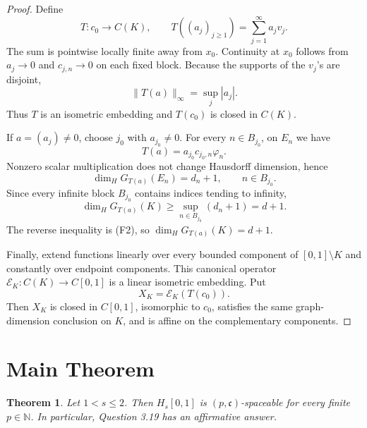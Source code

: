 \documentclass[11pt]{article}
\newtheorem*{theorem}{Theorem}
\newcommand{\cE}{\mathcal E}
\newcommand{\NN}{\mathbb N}
\newcommand{\cc}{\mathfrak c}
\newcommand{\dimH}{\dim_{\!H}}
\begin{document}
\begin{proof}
Define
\[
T:c_0\longrightarrow C(K),\qquad
T((a_j)_{j\geq1})=\sum_{j=1}^\infty a_jv_j.
\]
The sum is pointwise locally finite away from \(x_0\).  Continuity at \(x_0\)
follows from \(a_j\to0\) and \(c_{j,n}\to0\) on each fixed block.  Because the
supports of the \(v_j\)'s are disjoint,
\[
\|T(a)\|_\infty=\sup_j |a_j|.
\]
Thus \(T\) is an isometric embedding and \(T(c_0)\) is closed in \(C(K)\).

If \(a=(a_j)\neq0\), choose \(j_0\) with \(a_{j_0}\neq0\).  For every
\(n\in B_{j_0}\), on \(E_n\) we have
\[
T(a)=a_{j_0}c_{j_0,n}\varphi_n.
\]
Nonzero scalar multiplication does not change Hausdorff dimension, hence
\[
\dimH G_{T(a)}(E_n)=d_n+1,\qquad n\in B_{j_0}.
\]
Since every infinite block \(B_{j_0}\) contains indices tending to infinity,
\[
\dimH G_{T(a)}(K)\geq \sup_{n\in B_{j_0}}(d_n+1)=d+1.
\]
The reverse inequality is (F2), so \(\dimH G_{T(a)}(K)=d+1\).

Finally, extend functions linearly over every bounded component of
\([0,1]\setminus K\) and constantly over endpoint components.  This canonical
operator \(\cE_K:C(K)\to C[0,1]\) is a linear isometric embedding.  Put
\[
X_K=\cE_K(T(c_0)).
\]
Then \(X_K\) is closed in \(C[0,1]\), isomorphic to \(c_0\), satisfies the same
graph-dimension conclusion on \(K\), and is affine on the complementary
components.
\end{proof}

\section*{Main Theorem}

\begin{theorem}
Let \(1<s\leq2\).  Then \(H_s[0,1]\) is \((p,\cc)\)-spaceable for every finite
\(p\in\NN\).  In particular, Question 3.19 has an affirmative answer.
\end{theorem}
\end{document}
